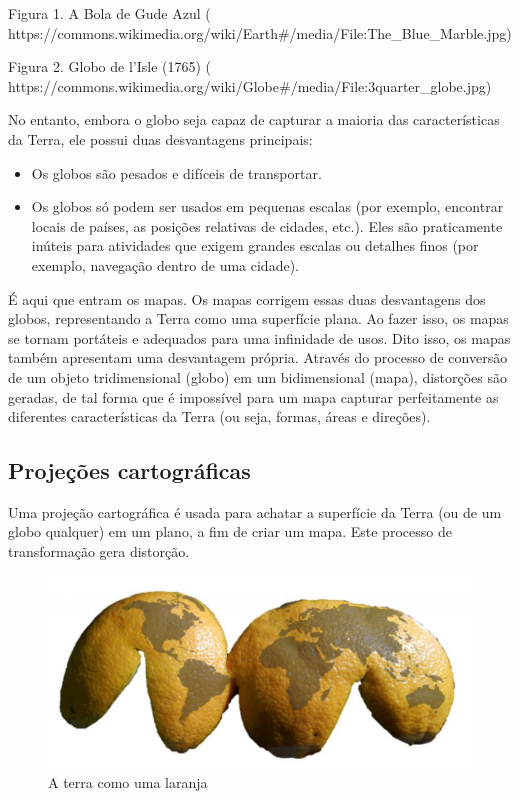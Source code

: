 \documentclass[
  portuguese,
]{krantz}
\providecommand{\tightlist}{%
  \setlength{\itemsep}{0pt}\setlength{\parskip}{0pt}}
\begin{document}
Figura 1. A Bola de Gude Azul ( https://commons.wikimedia.org/wiki/Earth\#/media/File:The\_Blue\_Marble.jpg)

Figura 2. Globo de l'Isle (1765) ( https://commons.wikimedia.org/wiki/Globe\#/media/File:3quarter\_globe.jpg)

No entanto, embora o globo seja capaz de capturar a maioria das características da Terra, ele possui duas desvantagens principais:

\begin{itemize}
\tightlist
\item
  Os globos são pesados e difíceis de transportar.
\item
  Os globos só podem ser usados em pequenas escalas (por exemplo, encontrar locais de países, as posições relativas de cidades, etc.). Eles são praticamente inúteis para atividades que exigem grandes escalas ou detalhes finos (por exemplo, navegação dentro de uma cidade).
\end{itemize}

É aqui que entram os mapas. Os mapas corrigem essas duas desvantagens dos globos, representando a Terra como uma superfície plana. Ao fazer isso, os mapas se tornam portáteis e adequados para uma infinidade de usos. Dito isso, os mapas também apresentam uma desvantagem própria. Através do processo de conversão de um objeto tridimensional (globo) em um bidimensional (mapa), distorções são geradas, de tal forma que é impossível para um mapa capturar perfeitamente as diferentes características da Terra (ou seja, formas, áreas e direções).

\hypertarget{projeuxe7uxf5es-cartogruxe1ficas}{%
\subsection{Projeções cartográficas}\label{projeuxe7uxf5es-cartogruxe1ficas}}

Uma projeção cartográfica é usada para achatar a superfície da Terra (ou de um globo qualquer) em um plano, a fim de criar um mapa. Este processo de transformação gera distorção.

\begin{figure}
\centering
\includegraphics{media/modulo0/dalandan.png}
\caption{A terra como uma laranja}
\end{figure}
\end{document}
